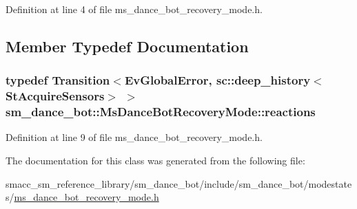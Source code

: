 Definition at line 4 of file ms\+\_\+dance\+\_\+bot\+\_\+recovery\+\_\+mode.\+h.



\subsection{Member Typedef Documentation}
\subsubsection[{\texorpdfstring{reactions}{reactions}}]{\setlength{\rightskip}{0pt plus 5cm}typedef Transition$<${\bf Ev\+Global\+Error}, sc\+::deep\+\_\+history$<${\bf St\+Acquire\+Sensors}$>$ $>$ {\bf sm\+\_\+dance\+\_\+bot\+::\+Ms\+Dance\+Bot\+Recovery\+Mode\+::reactions}}\hypertarget{classsm__dance__bot_1_1MsDanceBotRecoveryMode_a6e60e1284c7fa82c286c0a3388029e87}{}\label{classsm__dance__bot_1_1MsDanceBotRecoveryMode_a6e60e1284c7fa82c286c0a3388029e87}


Definition at line 9 of file ms\+\_\+dance\+\_\+bot\+\_\+recovery\+\_\+mode.\+h.



The documentation for this class was generated from the following file\+:\begin{DoxyCompactItemize}
\item 
smacc\+\_\+sm\+\_\+reference\+\_\+library/sm\+\_\+dance\+\_\+bot/include/sm\+\_\+dance\+\_\+bot/modestates/\hyperlink{include_2sm__dance__bot_2modestates_2ms__dance__bot__recovery__mode_8h}{ms\+\_\+dance\+\_\+bot\+\_\+recovery\+\_\+mode.\+h}\end{DoxyCompactItemize}
